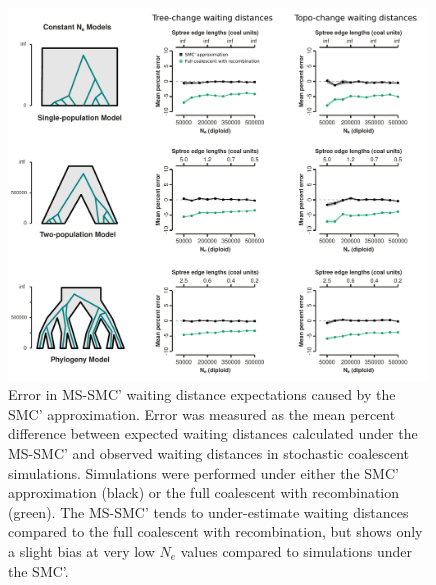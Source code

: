 \documentclass[11pt]{article}
\begin{document}
\begin{figure}[p]
	\centering
	\includegraphics[width=0.99\textwidth]{figures/error-smc-approx.pdf}
	\caption{
		Error in MS-SMC' waiting distance expectations caused by the 
		SMC' approximation. Error was measured as the mean percent 
		difference between expected waiting distances calculated
		under the MS-SMC' and observed waiting distances in stochastic 
		coalescent simulations. Simulations were performed under either 
		the SMC' approximation (black) or the full coalescent 
		with recombination (green). The MS-SMC' tends to under-estimate 
		waiting distances compared to the full coalescent with recombination, 
		but shows only a slight bias at very low $N_e$ values compared to 
		simulations under the SMC'. 
	}
     \label{fig:figS-bias-smc}
\end{figure}
\end{document}
